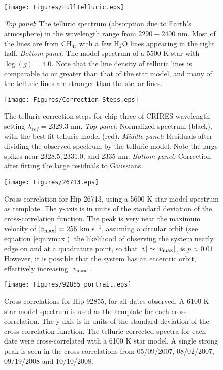 \documentclass[11pt]{report}     %
\begin{document}
\begin{figure}[ht]
  \centering
  \texttt{[image: Figures/FullTelluric.eps]}
  \caption{\emph{Top panel}: The telluric spectrum (absorption due to Earth's
    atmosphere) in the wavelength range from $2290-2400$ nm. Most of the lines are
    from CH$_4$, with a few H$_2$O lines appearing in the right
    half. \emph{Bottom panel}: The model spectrum of a 5500 K star
    with $\log (g) = 4.0$. Note that the line density of telluric
    lines is comparable to or greater than that of the star model, and many of the
    telluric lines are stronger than the stellar lines.}
  \label{telluric}
\end{figure}



\begin{figure}[ht]
  \centering
  \texttt{[image: Figures/Correction\_Steps.eps]}
  \caption{The telluric correction steps for chip three of CRIRES
    wavelength setting $\lambda_{ref} = 2329.3$ nm. \emph{Top panel:}
    Normalized spectrum (black), with the best-fit telluric model
    (red). \emph{Middle panel:} Residuals after dividing the observed
    spectrum by the telluric model. Note the large spikes near
    $2328.5, 2331.0$, and $2335$ nm. \emph{Bottom panel:} Correction
    after fitting the large residuals to Gaussians. }
  \label{correctionsteps}
\end{figure}


\begin{figure}[ht]
  \centering
  \texttt{[image: Figures/26713.eps]}
  \caption{Cross-correlation for Hip 26713, using a 5600 K star model spectrum as template. The y-axis is in units of
    the standard deviation of the cross-correlation function. The peak is very near the maximum velocity of $|v_{\rm max}| = 256$ km s$^{-1}$, assuming a circular orbit (see equation \ref{eqn:vmax}). the likelihood of observing the system nearly edge on and at a quadrature point, so that $|v| \sim |v_{\rm max}|$, is $p \approx 0.01$. However, it is possible that the system has an eccentric orbit, effectively increasing $|v_{\rm max}|$.}
  \label{fig:hip26713}
\end{figure}



\begin{figure}[ht]
  \centering
  \texttt{[image: Figures/92855\_portrait.eps]}
  \caption{Cross-correlations for Hip 92855, for all dates observed. A 6100 K star model spectrum is used as the template for each cross-correlation. The y-axis is in units of
    the standard deviation of the cross-correlation function. The
    telluric-corrected spectra for each date were cross-correlated
    with a 6100 K star model. A single strong peak is seen in the
    cross-correlations from 05/09/2007, 08/02/2007, 09/19/2008 and 10/10/2008. }
  \label{fig:hip92855}
\end{figure}
\end{document}
